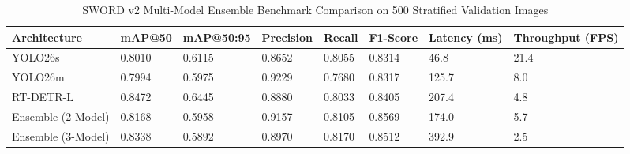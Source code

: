 \begin{table}
\caption{SWORD v2 Multi-Model Ensemble Benchmark Comparison on 500 Stratified Validation Images}
\label{tab:main_benchmark}
\begin{tabular}{llllllll}
\toprule
Architecture & mAP@50 & mAP@50:95 & Precision & Recall & F1-Score & Latency (ms) & Throughput (FPS) \\
\midrule
YOLO26s & 0.8010 & 0.6115 & 0.8652 & 0.8055 & 0.8314 & 46.8 & 21.4 \\
YOLO26m & 0.7994 & 0.5975 & 0.9229 & 0.7680 & 0.8317 & 125.7 & 8.0 \\
RT-DETR-L & 0.8472 & 0.6445 & 0.8880 & 0.8033 & 0.8405 & 207.4 & 4.8 \\
Ensemble (2-Model) & 0.8168 & 0.5958 & 0.9157 & 0.8105 & 0.8569 & 174.0 & 5.7 \\
Ensemble (3-Model) & 0.8338 & 0.5892 & 0.8970 & 0.8170 & 0.8512 & 392.9 & 2.5 \\
\bottomrule
\end{tabular}
\end{table}
